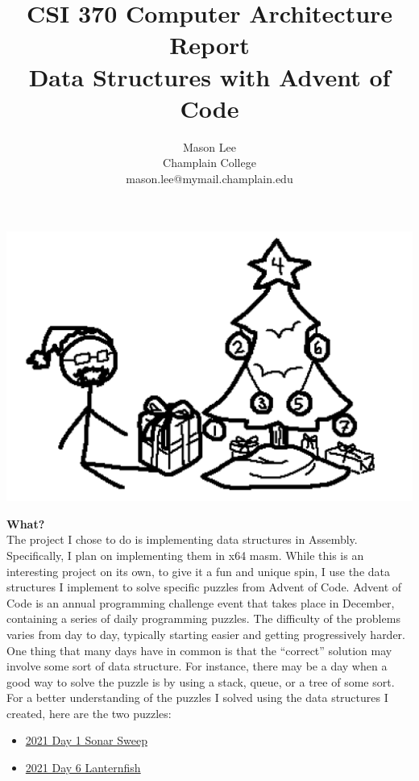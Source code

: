 \documentclass[twoside]{article}
\date{}
\begin{document}
\title{CSI 370 Computer Architecture Report\\ Data Structures with Advent of Code}
\author{Mason Lee \\
Champlain College\\
mason.lee@mymail.champlain.edu}
\maketitle

\begin{center}
    \includegraphics[width=.6\textwidth]{images/BrianHallChristmas.png}\\
\end{center}

\renewcommand{\labelitemi}{$\diamond$}
\noindent\textbf{\Large What?}\\
\noindent The project I chose to do is implementing data structures in Assembly. Specifically, I plan on implementing them in x64 masm. While this is an interesting project on its own, to give it a fun and unique spin, I use the data structures I implement to solve specific puzzles from Advent of Code. Advent of Code is an annual programming challenge event that takes place in December, containing a series of daily programming puzzles.  The difficulty of the problems varies from day to day, typically starting easier and getting progressively harder. One thing that many days have in common is that the “correct” solution may involve some sort of data structure. For instance, there may be a day when a good way to solve the puzzle is by using a stack, queue, or a tree of some sort. \\

\noindent For a better understanding of the puzzles I solved using the data structures I created, here are the two puzzles:
\begin{itemize}
    \item \href{https://adventofcode.com/2021/day/1}{2021 Day 1 Sonar Sweep}
    \item \href{https://adventofcode.com/2021/day/6}{2021 Day 6 Lanternfish}
\end{itemize}
\end{document}
